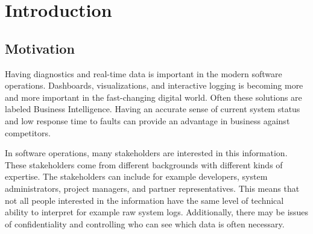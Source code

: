 \documentclass[english,12pt,a4paper,pdftex,sci,utf8]{aaltothesis}
\theoremstyle{definition}
\begin{document}
\cleardoublepage
\storeinipagenumber
{}
\setcounter{page}{1}


\section{Introduction}
\thispagestyle{empty}

\subsection{Motivation}
Having diagnostics and real-time data is important in the modern software operations.
Dashboards, visualizations, and interactive logging is becoming more and more important
in the fast-changing digital world. Often these solutions are labeled Business Intelligence.
Having an accurate sense of current system status and low response time to faults can provide an advantage
in business against competitors.


In software operations, many stakeholders are interested in this information. 
These stakeholders come from different backgrounds with different kinds of expertise.
The stakeholders can include for example developers, system administrators, project managers, and partner representatives.
This means that not all people interested in the information have the same level of technical ability to 
interpret for example raw system logs. Additionally, there may be issues of confidentiality and
controlling who can see which data is often necessary.
\end{document}
